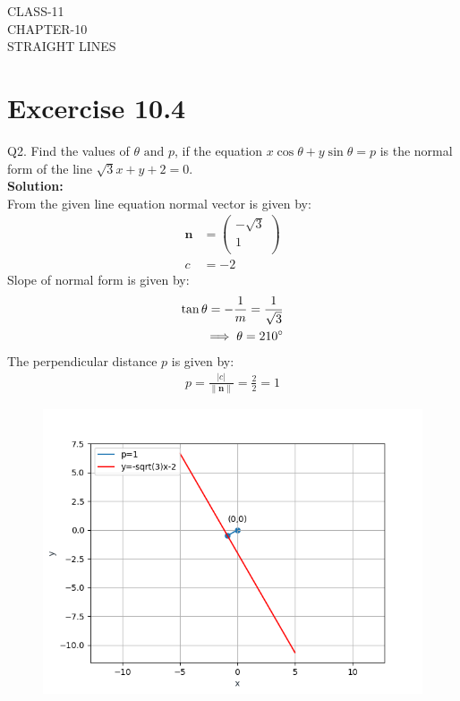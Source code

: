 \documentclass[12pt]{article}
\providecommand{\norm}[1]{\left\lVert#1\right\rVert}
\newcommand{\solution}{\noindent \textbf{Solution: }}
\newcommand{\myvec}[1]{\ensuremath{\begin{pmatrix}#1\end{pmatrix}}}
\let\vec\mathbf
\begin{document}
\begin{center}
\textbf\large{CLASS-11 \\ CHAPTER-10 \\ STRAIGHT LINES}
\end{center}
\section*{Excercise 10.4}

Q2. Find the values of $\theta \text{ and } p$, if the equation $x\cos\theta+y\sin\theta=p$ is the normal form
of the line $\sqrt{3}x+y+2=0$.
\\
\solution
\\
From the given line equation normal vector is given by:
		\begin{align}
	\vec{n}&=\myvec{-\sqrt{3}\\1\\}\\
			c&=-2
		\end{align}
	Slope of normal form is given by:
		\begin{align}
			\tan\theta=-\frac{1}{m}=\frac{1}{{\sqrt{3}}}\\
		\implies \theta=210\degree
		\end{align}
	The perpendicular distance $p$ is given by:
		\begin{align}
			p=\frac{|c|}{\norm{\vec{n}}}=\frac{2}{2}=1
		\end{align}
\begin{figure}[H]
	\begin{center} 
	    \includegraphics[width=\columnwidth]{figs/line.png}
	\end{center}
\caption{}
\label{fig:Fig1}
\end{figure}
\end{document}
